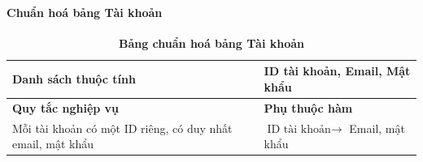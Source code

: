 \paragraph{Chuẩn hoá bảng Tài khoản}
\mbox{}
\begin{table}[H]
	\caption{\bfseries \fontsize{12pt}{0pt}\selectfont Bảng chuẩn hoá bảng Tài khoản}
	\centering
	\begin{tabularx}{0.9\textwidth}{|X|X|}
		\hline
		\textbf{Danh sách thuộc tính} & ID tài khoản, Email, Mật khẩu                                             \\
		\hline
		\textbf{Quy tắc nghiệp vụ}    & \textbf{Phụ thuộc hàm}                                                    \\
		\hline
		Mỗi tài khoản có một ID riêng, có duy nhất email, mật khẩu
		                              & \parbox[t]{\linewidth}{$\text{ID tài khoản} \rightarrow$ Email, mật khẩu} \\
		\hline
		                              \\
		                                        \\
		\hline
	\end{tabularx}
\end{table}


